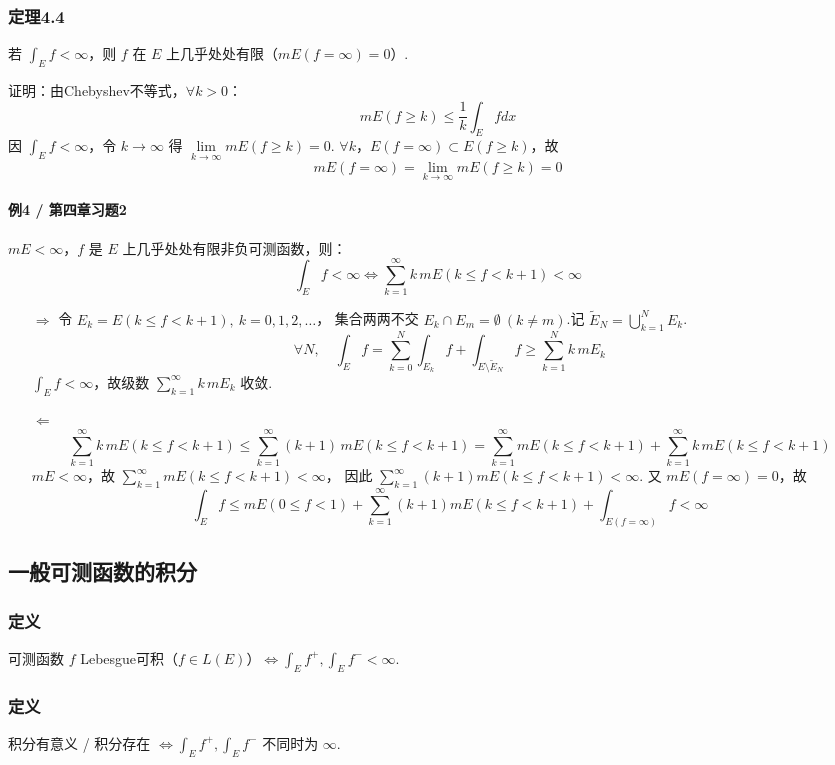 \documentclass{article}
\begin{document}
	\subsubsection{定理4.4}
	若 $\displaystyle \int_E f < \infty$，则 $f$ 在 $E$ 上几乎处处有限（$mE(f=\infty)=0$）.
	
	证明：由Chebyshev不等式，$\forall k>0$：
	\[
	mE(f\ge k) \le \frac1k\int_E f dx
	\]
	因 $\int_E f<\infty$，令 $k\to\infty$ 得 $\lim\limits_{k\to\infty}mE(f\ge k)=0$.
	$\forall k$，$E(f=\infty)\subset E(f\ge k)$，故
	\[
	mE(f=\infty) = \lim_{k\to\infty}mE(f\ge k) = 0
	\]
	
	\paragraph{例4 / 第四章习题2}
	$mE<\infty$，$f$ 是 $E$ 上几乎处处有限非负可测函数，则：
	\[
	\displaystyle \int_E f < \infty \iff \sum_{k=1}^\infty k\,mE(k\le f<k+1) < \infty
	\]
	\begin{enumerate}
		\item[$\Rightarrow$] 令 $E_k = E(k\le f<k+1),\ k=0,1,2,\dots$，
		集合两两不交 $E_k\cap E_m=\emptyset\ (k\ne m)$.记 $\tilde{E}_N=\bigcup_{k=1}^N E_k$.
		\[
		\forall N,\quad
		\int_E f = \sum_{k=0}^N \int_{E_k}f + \int_{E\setminus \tilde{E}_N}f
		\ge \sum_{k=1}^N k\,mE_k
		\]
		$\int_E f<\infty$，故级数 $\displaystyle \sum_{k=1}^\infty k\,mE_k$ 收敛.
		\item[$\Leftarrow$]
		\[
		\sum_{k=1}^\infty k\,mE(k\le f<k+1)
		\le \sum_{k=1}^\infty (k+1)\,mE(k\le f<k+1)
		= \sum_{k=1}^\infty mE(k\le f<k+1) + \sum_{k=1}^\infty k\,mE(k\le f<k+1)
		\]
		$mE<\infty$，故 $\displaystyle \sum_{k=1}^\infty mE(k\le f<k+1) < \infty$，
		因此 $\displaystyle \sum_{k=1}^\infty (k+1)mE(k\le f<k+1) < \infty$.
		又 $mE(f=\infty)=0$，故
		\[
		\int_E f \le mE(0\le f<1)
		+ \sum_{k=1}^\infty (k+1)mE(k\le f<k+1)
		+ \int_{E(f=\infty)} f < \infty
		\]
	\end{enumerate}
	
	\subsection{一般可测函数的积分}
	\subsubsection{定义}
	可测函数 $f$ Lebesgue可积（$f\in L(E)$）$\iff \displaystyle \int_E f^+,\int_E f^- < \infty$.
	
	\subsubsection{定义}
	积分有意义 / 积分存在 $\iff \displaystyle \int_E f^+,\int_E f^-$ 不同时为 $\infty$.
	
\end{document}
